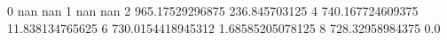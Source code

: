 0 nan nan
1 nan nan
2 965.17529296875 236.845703125
4 740.167724609375 11.838134765625
6 730.0154418945312 1.68585205078125
8 728.32958984375 0.0
